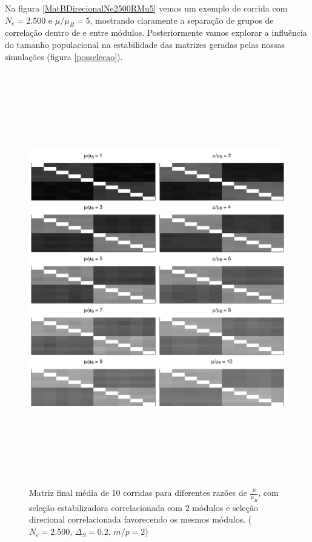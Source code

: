 Na figura \ref{MatBDirecionalNe2500RMu5} vemos um exemplo de corrida com
$N_e = 2.500$ e $\mu/\mu_B=5$, mostrando claramente a separação de grupos
de correlação dentro de e entre módulos. 
Posteriormente vamos explorar a influência do tamanho populacional na
estabilidade das matrizes geradas pelas nossas simulações (figura
\ref{posselecao}). 


\begin{figure}[htbp]
    \centering
    \includegraphics[width=150mm, height=180mm]{figuras/MatBDirecRMu}
    \caption{Matriz final média de 10 corridas para diferentes razões de
        $\frac{\mu}{\mu_B}$, com seleção estabilizadora correlacionada com 2
        módulos e seleção direcional correlacionada favorecendo os mesmos
    módulos. ($N_e=2.500$, $\Delta_S=0.2$, $m/p=2$)}
    \label{MatBDirecional-RMu}
\end{figure}



